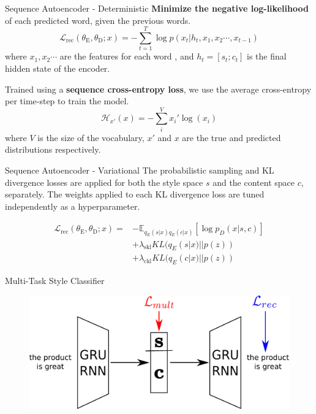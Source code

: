 \documentclass[aspectratio=169]{beamer}
\newcommand{\loss}[1]{\mathcal{L}_{\text{#1}}}
\newcommand{\weight}[1]{\lambda_{\text{#1}}}
\newcommand{\param}[1]{\theta_{\text{#1}}}
\begin{document}
\begin{frame}{Sequence Autoencoder - Deterministic}
	\textbf{Minimize the negative log-likelihood} of each predicted word, given the previous words.
	\begin{equation} \label{eqn:dae-rec}
		\loss{rec}(\param{E},\param{D}; x) = - \sum_{t=1}^T \log p(x_t | h_t, x_1, x_2 \cdots, x_{t-1})
	\end{equation}
	where $x_1, x_2 \cdots$ are the features for each word \citep{mikolov2013distributed,pennington2014glove}, and $h_t = [s_t; c_t]$ is the final hidden state of the encoder.

	Trained using a \textbf{sequence cross-entropy loss}, we use the average cross-entropy per time-step to train the model.
	\begin{equation*}
		\mathcal{H}_{x'} (x) = - \sum_{i}^V x_{i}' \log (x_i)
	\end{equation*}
	where $V$ is the size of the vocabulary, $x'$ and $x$ are the true and predicted distributions respectively.
\end{frame}

\begin{frame}{Sequence Autoencoder - Variational}
	The probabilistic sampling and KL divergence losses are applied for both the style space $s$ and the content space $c$, separately. The weights applied to each KL divergence loss are tuned independently as a hyperparameter.

	\begin{align} \label{eqn:vae-rec}
		\loss{rec}(\param{E},\param{D}; x) =
		 & - \mathbb{E}_{q_{E}(s|x) q_{E}(c|x)} [\log p_D(x|s,c)] \nonumber \\
		 & + \weight{skl} KL(q_{E}(s|x)||p(z))                    \nonumber \\
		 & + \weight{ckl} KL(q_{E}(c|x)||p(z))
	\end{align}
\end{frame}

\begin{frame}{Multi-Task Style Classifier}
	\centering
	\begin{figure}[ht]
		\includegraphics[width=\textwidth]{images/overview-training-2}
	\end{figure}
\end{frame}
\end{document}
